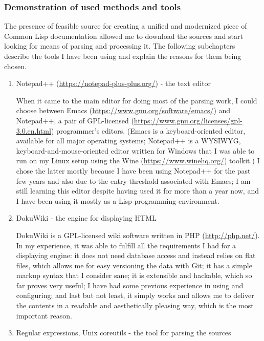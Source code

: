 \subsubsection{Demonstration of used methods and
tools}\label{demonstration-of-used-methods-and-tools}

The presence of feasible source for creating a unified and modernized
piece of Common Lisp documentation allowed me to download the sources
and start looking for means of parsing and processing it. The following
subchapters describe the tools I have been using and explain the reasons
for them being chosen.

\begin{enumerate}
\item
  Notepad++ (\url{https://notepad-plus-plus.org/}) - the text editor

  When it came to the main editor for doing most of the parsing work, I
  could choose between Emacs (\url{https://www.gnu.org/software/emacs/})
  and Notepad++, a pair of GPL-licensed
  (\url{https://www.gnu.org/licenses/gpl-3.0.en.html}) programmer's
  editors. (Emacs is a keyboard-oriented editor, available for all major
  operating systems; Notepad++ is a WYSIWYG, keyboard-and-mouse-oriented
  editor written for Windows that I was able to run on my Linux setup
  using the Wine (\url{https://www.winehq.org/}) toolkit.) I chose the
  latter mostly because I have been using Notepad++ for the past few
  years and also due to the entry threshold associated with Emacs; I am
  still learning this editor despite having used it for more than a year
  now, and I have been using it mostly as a Lisp programming
  environment.
\item
  DokuWiki - the engine for displaying HTML

  DokuWiki is a GPL-licensed wiki software written in PHP
  (\url{http://php.net/}). In my experience, it was able to fulfill all
  the requirements I had for a displaying engine: it does not need
  database access and instead relies on flat files, which allows me for
  easy versioning the data with Git; it has a simple markup syntax that
  I consider sane; it is extensible and hackable, which so far proves
  very useful; I have had some previous experience in using and
  configuring; and last but not least, it simply works and allows me to
  deliver the contents in a readable and aesthetically pleasing way,
  which is the most important reason.
\item
  Regular expressions, Unix coreutils - the tool for parsing the sources


\end{enumerate}

